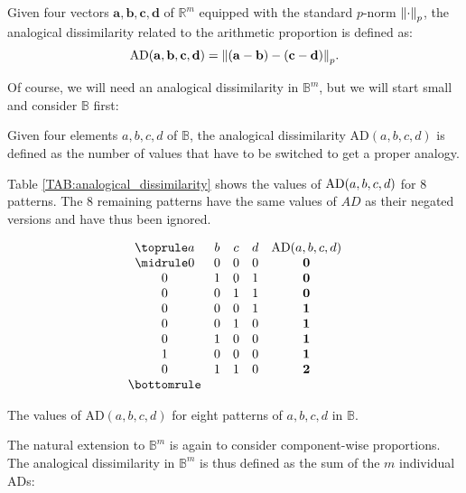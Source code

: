 \begin{definition}
  \label{DEF:AD_arithmetic_proportion}
  Given four vectors $\mathbf{a}, \mathbf{b},\mathbf{c},\mathbf{d}$ of
  $\mathbb{R}^m$ equipped with the standard $p$-norm $\norm{p}{\cdot}$, the
  analogical dissimilarity related to the arithmetic proportion is defined as:
  $$\text{AD}(\mathbf{a}, \mathbf{b},\mathbf{c},\mathbf{d}) =
  \norm{p}{(\mathbf{a} - \mathbf{b}) - (\mathbf{c} - \mathbf{d})}.$$
\end{definition}

Of course, we will need an analogical dissimilarity in $\mathbb{B}^m$, but we
will start small and consider $\mathbb{B}$ first:
\begin{definition}
  \label{DEF:AD_boolean_proportion}
  Given four elements $a, b, c, d$ of $\mathbb{B}$, the analogical
  dissimilarity $\text{AD}(a, b, c, d)$ is defined as the number of values that
  have to be switched to get a proper analogy.
\end{definition}
\noindent
Table \ref{TAB:analogical_dissimilarity} shows the values of $\AD(a, b, c, d)$
for 8 patterns. The $8$ remaining patterns have the same values of $AD$ as
their negated versions and have thus been ignored.
\begin{table}[t]
  \centering
  $$
  \begin{array}{ccccc}
    \toprule
    a & b & c & d &  \AD(a, b, c, d)\\
    \midrule
    0 & 0 & 0 & 0 &   \textbf{0}\\
    0 & 1 & 0 & 1 &   \textbf{0}\\
    0 & 0 & 1 & 1 &   \textbf{0}\\
    0 & 0 & 0 & 1 &   \textbf{1}\\
    0 & 0 & 1 & 0 &   \textbf{1}\\
    0 & 1 & 0 & 0 &   \textbf{1}\\
    1 & 0 & 0 & 0 &   \textbf{1}\\
    0 & 1 & 1 & 0 &   \textbf{2}\\
    \bottomrule
  \end{array}
  $$
  \caption{The values of $\text{AD}(a, b, c,d)$ for eight patterns of $a, b, c,
  d$ in $\mathbb{B}$.}
  \label{TAB:analogical_dissimilarity}
\end{table}
The natural extension to $\mathbb{B}^m$ is again to consider component-wise
proportions. The analogical dissimilarity in $\mathbb{B}^m$ is thus defined as
the sum of the $m$ individual ADs:
